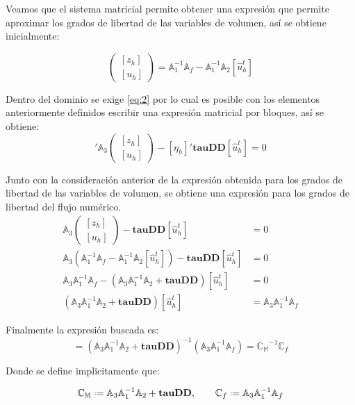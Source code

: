 \documentclass{article}
\begin{document}
\noindent Veamos que el sistema matricial permite obtener una expresión que permite aproximar los grados de libertad  de las variables de volumen, así se obtiene inicialmente:

\begin{equation*}
	\left( \begin{array}{cc}{[z_h]} \\ {[u_h]} \end{array} \right )
	=
	\mathbb{A}_1^{-1} \mathbb{A}_f - \mathbb{A}_1^{-1} \mathbb{A}_2  [\hat{u}^t_h]
\end{equation*}

\noindent Dentro del dominio se exige \eqref{eq:2} por lo cual es posible con los elementos anteriormente definidos escribir una expresión matricial por bloques, así se obtiene:
\begin{equation*}
[\eta_h]' \mathbb{A}_3
    \left(
    \begin{array}{cc}
        {[z_h]} \\
        {[u_h]}
    \end{array}
    \right )
    - [\eta_h]' \mathbf{tauDD} [\hat{u}^t_h] = 0
\end{equation*}

\noindent Junto con la consideración anterior de la expresión obtenida para los grados de libertad de las variables de volumen, se obtiene una expresión para los grados de libertad del flujo numérico.
\begin{align*}
    \mathbb{A}_3
    \left(
    \begin{array}{cc}
        {[z_h]} \\
        {[u_h]}
    \end{array}
    \right )
    - \mathbf{tauDD} [\hat{u}^t_h] &= 0 \\
    \mathbb{A}_3
    \left(
    \mathbb{A}_1^{-1} \mathbb{A}_f - \mathbb{A}_1^{-1} \mathbb{A}_2  [\hat{u}^t_h]
    \right )
    - \mathbf{tauDD} [\hat{u}^t_h] &= 0 \\
    \mathbb{A}_3  \mathbb{A}_1^{-1} \mathbb{A}_f
    - \left( \mathbb{A}_3  \mathbb{A}_1^{-1} \mathbb{A}_2  + \mathbf{tauDD} \right ) [\hat{u}^t_h] &= 0 \\
    \left( \mathbb{A}_3  \mathbb{A}_1^{-1} \mathbb{A}_2  + \mathbf{tauDD} \right ) [\hat{u}^t_h]  &=
    \mathbb{A}_3  \mathbb{A}_1^{-1} \mathbb{A}_f
\end{align*}

\noindent Finalmente la expresión buscada es:
\begin{equation}
	[\hat{u}^t_h]  =
    \left( \mathbb{A}_3  \mathbb{A}_1^{-1} \mathbb{A}_2  + \mathbf{tauDD} \right )^{-1} ( \mathbb{A}_3  \mathbb{A}_1^{-1} \mathbb{A}_f ) = \mathbb{C_M}^{-1} \mathbb{C}_f
\end{equation}

\noindent Donde se define implicitamente que:

\begin{equation*}
	\mathbb{C_M} \defeq \mathbb{A}_3  \mathbb{A}_1^{-1} \mathbb{A}_2  + \mathbf{tauDD} , \qquad
	\mathbb{C}_f \defeq \mathbb{A}_3  \mathbb{A}_1^{-1} \mathbb{A}_f
\end{equation*}
\end{document}
